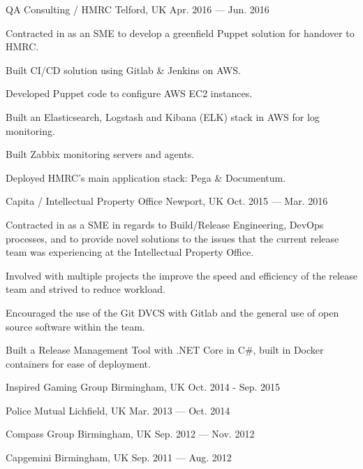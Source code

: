 \begin{cventries}
    {QA Consulting / HMRC} %
    {Telford, UK} %
    {Apr. 2016 — Jun. 2016} %
    {
        \begin{cvitems} %
        \item {Contracted in as an SME to develop a greenfield Puppet solution for handover to HMRC.}
        \item {Built CI/CD solution using Gitlab \& Jenkins on AWS.}
        \item {Developed Puppet code to configure AWS EC2 instances.}
        \item{Built an Elasticsearch, Logstash and Kibana (ELK) stack in AWS for log monitoring.}
        \item {Built Zabbix monitoring servers and agents.}
        \item {Deployed HMRC's main application stack: Pega \& Documentum.}
        \end{cvitems}
    }


    {Capita / Intellectual Property Office} %
    {Newport, UK} %
    {Oct. 2015 — Mar. 2016} %
    {
        \begin{cvitems} %
        \item {Contracted in as a SME in regards to Build/Release Engineering, DevOps processes, and to provide novel solutions to the issues that the current release team was experiencing at the Intellectual Property Office.}
        \item {Involved with multiple projects the improve the speed and efficiency of the release team and strived to reduce workload.}
        \item {Encouraged the use of the Git DVCS with Gitlab and the general use of open source software within the team.}
        \item {Built a Release Management Tool with .NET Core in C\#, built in Docker containers for ease of deployment.}
        \end{cvitems}
    }

    
    {Inspired Gaming Group} %
    {Birmingham, UK} %
    {Oct. 2014 - Sep. 2015} %
    {}

    
    {Police Mutual} %
    {Lichfield, UK} %
    {Mar. 2013 — Oct. 2014} %
    {}

    {Compass Group} %
    {Birmingham, UK} %
    {Sep. 2012 — Nov. 2012} %
    {}

    {Capgemini} %
    {Birmingham, UK} %
    {Sep. 2011 — Aug. 2012} %
    {}

\end{cventries}
